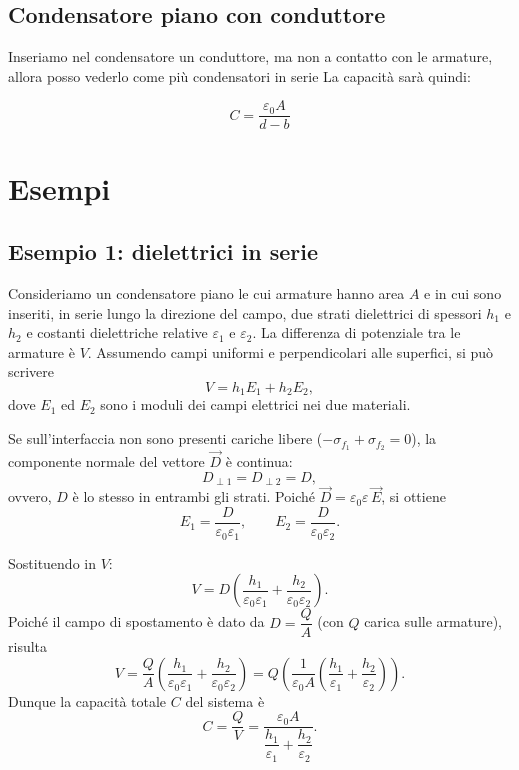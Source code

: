 \documentclass{book}
\begin{document}
\subsection{Condensatore piano con conduttore}
Inseriamo nel condensatore un conduttore, ma non a contatto con le armature, allora posso vederlo come più condensatori in serie
La capacità sarà quindi:


$$
C = \frac{\varepsilon_0 A}{d-b}
$$






\section{Esempi}

\subsection*{Esempio 1: dielettrici in serie}

Consideriamo un condensatore piano le cui armature hanno area \(A\) e in cui sono inseriti, in serie lungo la direzione del campo, due strati dielettrici di spessori \(h_1\) e \(h_2\) e costanti dielettriche relative \(\varepsilon_1\) e \(\varepsilon_2\). La differenza di potenziale tra le armature è \(V\). Assumendo campi uniformi e perpendicolari alle superfici, si può scrivere
\[
V = h_1 E_1 + h_2 E_2,
\]
dove \(E_1\) ed \(E_2\) sono i moduli dei campi elettrici nei due materiali.

Se sull'interfaccia non sono presenti cariche libere ($-\sigma_{{f}_{1}}+ \sigma_{{f}_{2}} = 0$), la componente normale del vettore \(\vec{D}\) è continua:
\[
D_{\perp1} = D_{\perp2} = D,
\]
ovvero, \(D\) è lo stesso in entrambi gli strati. Poiché \(\vec{D}=\varepsilon_0\varepsilon\,\vec{E}\), si ottiene
\[
E_1 = \frac{D}{\varepsilon_0\varepsilon_1},\qquad
E_2 = \frac{D}{\varepsilon_0\varepsilon_2}.
\]

Sostituendo in \(V\):
\[
V = D\left(\frac{h_1}{\varepsilon_0\varepsilon_1}+\frac{h_2}{\varepsilon_0\varepsilon_2}\right).
\]
Poiché il campo di spostamento è dato da \(D = \dfrac{Q}{A}\) (con \(Q\) carica sulle armature), risulta
\[
V = \frac{Q}{A}\left(\frac{h_1}{\varepsilon_0\varepsilon_1}+\frac{h_2}{\varepsilon_0\varepsilon_2}\right)
= Q\left(\frac{1}{\varepsilon_0 A}\left(\frac{h_1}{\varepsilon_1}+\frac{h_2}{\varepsilon_2}\right)\right).
\]
Dunque la capacità totale \(C\) del sistema è
\[
C=\frac{Q}{V}=\frac{\varepsilon_0 A}{\dfrac{h_1}{\varepsilon_1}+\dfrac{h_2}{\varepsilon_2}}.
\]
\end{document}
